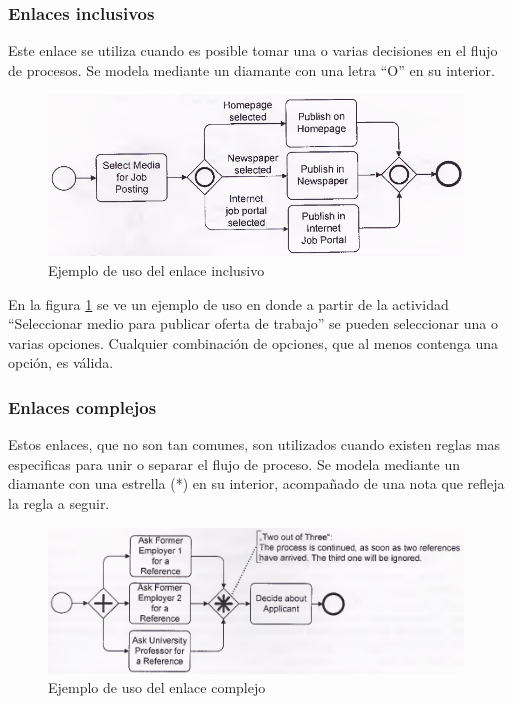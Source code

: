 \subsubsection{Enlaces inclusivos}

Este enlace se utiliza cuando es posible tomar una o varias decisiones en el flujo de procesos. Se modela mediante un diamante con una letra ``O'' en su interior.

\begin{figure}[!htb]
  \begin{center}
    \includegraphics[width=11cm]{./imagenes/gateway_inclusivo.png}
    \caption{Ejemplo de uso del enlace inclusivo}
    \label{fig:gateway_inclusivo}
  \end{center}
\end{figure}

En la figura \ref{fig:gateway_inclusivo} se ve un ejemplo de uso en donde a partir de la actividad ``Seleccionar medio para publicar oferta de trabajo'' se pueden seleccionar una o varias opciones. Cualquier combinación de opciones, que al menos contenga una opción, es válida.

\subsubsection{Enlaces complejos}

Estos enlaces, que no son tan comunes, son utilizados cuando existen reglas mas especificas para unir o separar el flujo de proceso. Se modela mediante un diamante con una estrella (*) en su interior, acompañado de una nota que refleja la regla a seguir.

\begin{figure}[!htb]
  \begin{center}
    \includegraphics[width=11cm]{./imagenes/gateway_complejo.png}
    \caption{Ejemplo de uso del enlace complejo}
    \label{fig:gateway_complejo}
  \end{center}
\end{figure}

